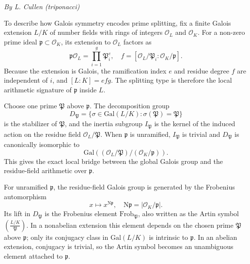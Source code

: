 \begin{center}\textit{By L. Cullen (triponacci)}\end{center}

To describe how Galois symmetry encodes prime splitting, fix a finite Galois extension $L/K$ of number fields with rings of integers $\mathcal{O}_L$ and $\mathcal{O}_K$. For a non-zero prime ideal $\mathfrak{p} \subset \mathcal{O}_K$, its extension to $\mathcal{O}_L$ factors as
\begin{equation}
\mathfrak{p}\mathcal{O}_L = \prod_{i=1}^g \mathfrak{P}_i^e, \quad f = [\mathcal{O}_L/\mathfrak{P}_i : \mathcal{O}_K/\mathfrak{p}].
\end{equation}
Because the extension is Galois, the ramification index $e$ and residue degree $f$ are independent of $i$, and $[L : K] = efg$. The splitting type is therefore the local arithmetic signature of $\mathfrak{p}$ inside $L$.

Choose one prime $\mathfrak{P}$ above $\mathfrak{p}$. The decomposition group
\begin{equation}
D_{\mathfrak{P}} = \{\sigma \in \text{Gal}(L/K) : \sigma(\mathfrak{P}) = \mathfrak{P}\}
\end{equation}
is the stabilizer of $\mathfrak{P}$, and the inertia subgroup $I_{\mathfrak{P}}$ is the kernel of the induced action on the residue field $\mathcal{O}_L/\mathfrak{P}$. When $\mathfrak{p}$ is unramified, $I_{\mathfrak{P}}$ is trivial and $D_{\mathfrak{P}}$ is canonically isomorphic to
\begin{equation}
\text{Gal}((\mathcal{O}_L/\mathfrak{P})/(\mathcal{O}_K/\mathfrak{p})).
\end{equation}
This gives the exact local bridge between the global Galois group and the residue-field arithmetic over $\mathfrak{p}$.

For unramified $\mathfrak{p}$, the residue-field Galois group is generated by the Frobenius automorphism
\begin{equation}
x \longmapsto x^{\text{N}\mathfrak{p}}, \quad \text{N}\mathfrak{p} = |\mathcal{O}_K/\mathfrak{p}|.
\end{equation}
Its lift in $D_{\mathfrak{P}}$ is the Frobenius element $\text{Frob}_{\mathfrak{P}}$, also written as the Artin symbol $\left(\frac{L/K}{\mathfrak{P}}\right)$. In a nonabelian extension this element depends on the chosen prime $\mathfrak{P}$ above $\mathfrak{p}$; only its conjugacy class in $\text{Gal}(L/K)$ is intrinsic to $\mathfrak{p}$. In an abelian extension, conjugacy is trivial, so the Artin symbol becomes an unambiguous element attached to $\mathfrak{p}$.

